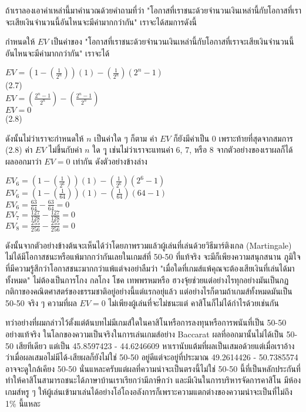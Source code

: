 \documentclass{article}
\begin{document}
ถ้าเราลองเอาค่าเหล่านี้มาคำนวณด้วยคำถามที่ว่า "โอกาสที่เราชนะด้วยจำนวนเงินเหล่านี้กับโอกาสที่เราจะเสียเงินจำนวนนี้อันไหนจะมีค่ามากกว่ากัน" เราจะได้สมการดังนี้ 

กำหนดให้ $EV$ เป็นค่าของ "โอกาสที่เราชนะด้วยจำนวนเงินเหล่านี้กับโอกาสที่เราจะเสียเงินจำนวนนี้อันไหนจะมีค่ามากกว่ากัน" เราจะได้
\begin{center}
$EV=(1-(\frac{1}{2^n}))(1) - (\frac{1}{2^n})(2^n-1)$\\
(2.7)\\
$EV=(\frac{2^n-1}{2^n}) - (\frac{2^n-1}{2^n})$\\
$EV=0$\\
(2.8)
\end{center}

ดังนั้นไม่ว่าเราจะกำหนดให้ $n$ เป็นค่าใด ๆ ก็ตาม ค่า $EV$ ก็ยังมีค่าเป็น 0 เพราะท้ายที่สุดจากสมการ (2.8) ค่า $EV$ ไม่ขึ้นกับค่า $n$ ใด ๆุ เช่นไม่ว่าเราจะแทนค่า 6, 7, หรือ 8 จากตัวอย่างของเราผลก็ได้ผลออกมาว่า $EV=0$ เท่ากัน ดังตัวอย่างข้างล่าง

\begin{center}
$EV_6=(1-(\frac{1}{2^6}))(1) - (\frac{1}{2^6})(2^6-1)$\\
$EV_6=(1-(\frac{1}{64}))(1) - (\frac{1}{64})(64-1)$\\
$EV_6=\frac{63}{64} - \frac{63}{64}=0$\\
$EV_7=\frac{127}{128} - \frac{127}{128}=0$\\
$EV_8=\frac{255}{256} - \frac{255}{256}=0$\\
\end{center}

ดังนั้นจากตัวอย่างข้างต้นจะเห็นได้ว่าโดยภาพรวมแล้วผู้เล่นที่เล่นด้วยวิธีมาร์ติงเกล (Martingale) ไม่ได้มีโอกาสชนะหรือแพ้มากกว่ากันเลยในเกมส์ที่ 50-50 ที่แท้จริง จะมีก็เพียงความสนุกสนาน ภูมิใจที่มีความรู้สึกว่าโอกาสชนะมากกว่าแพ้แต่จงอย่าลืมว่า "เมื่อใดที่เกมส์แพ้คุณจะต้องเสียเงินที่เล่นได้มาทั้งหมด" ไม่ต้องเป็นการโกง กลโกง โชค เทพพรหมหรือ ฮวงจุ้ยช่วยแต่อย่างไรทุกอย่างมันเป็นกฏกติกาของคณิตศาสตร์ของธรรมชาติอยู่อย่างนี้แต่แรกอยุ่แล้ว แต่อย่างไรก็ตามถ้าเกมส์ทั้งหมดมันเป็น 50-50 จริง ๆ ความที่ผล $EV=0$  ไม่เพียงผู้เล่นที่จะไม่ชนะแต่ คาสิโนก็ไม่ได้กำไรด้วยเช่นกัน

ทว่าอย่างที่ผมกล่าวไว้ตั้งแต่ต้นบทไม่มีเกมส์ใดในคาสิโนหรือการลงทุนหรือการพนันที่เป็น 50-50 อย่างแท้จริง ในโลกของความเป็นจริงในการเล่นเกมส์อย่าง Baccarat ผลที่ออกมานั้นไม่ได้เป็น 50-50 เสียทีเดียว แต่เป็น 45.8597423 - 44.6246609 หาเรานับแต้มที่ผลเป็นเสมอด้วยแต่เมื่อเราอ้างว่าเมื่อผลเสมอไม่มีได้-เสียผลก็ยังไม่ใช่ 50-50 อยู่ดีแต่จะอยู่ที่ประมาณ 49.2614426 - 50.7385574 อาจจะดูใกล้เคียง 50-50 นั่นแหละครับแต่ผลที่ความน่าจะเป็นตรงนี้ไม่ใช่ 50-50 นี้ที่เป็นหลักประกันที่ทำให้คาสิโนสามารถชนะได้ภาษาบ้านเราเรียกว่ามีภาษีกว่า และมีเงินในการบริหารจัดการคาสิโน มีห้องเกมส์หรู ๆ ให้ผู้เล่นเข้ามาเล่นได้อย่างโอ่โถงอลังการก็เพราะความแตกต่างของความน่าจะเป็นที่ไม่ถึง 1\% นี้แหละ
\end{document}
